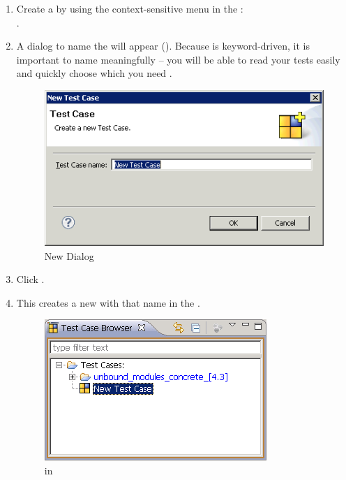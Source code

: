 \begin{enumerate}
\item Create a \gdcase{} by using the context-sensitive menu in the \gdtestcasebrowser{}:\\
.

\item A dialog to name the \gdcase{} will appear (). Because \app{} is keyword-driven, it is important to name \gdcases{} meaningfully --  you will be able to read your tests easily and quickly choose which \gdcase{} you need  . 

\begin{figure}[h]
\begin{center}
\includegraphics[width=12.5cm]{Tasks/Testcases/PS/newtestcasedialog}
\caption{New \gdcase{} Dialog}
\label{newtestcasedialog}
\end{center}
\end{figure} 

\item Click . 
\item This creates a new \gdcase{} with that name in the \gdtestcasebrowser{} .

\begin{figure}[h]
\begin{center}
\includegraphics{Tasks/Testcases/PS/newtestcaseinbrowser}
\caption{\gdcase{} in \gdtestcasebrowser{}}
\label{newtestcaseinbrowser}
\end{center}
\end{figure} 

\end{enumerate}

